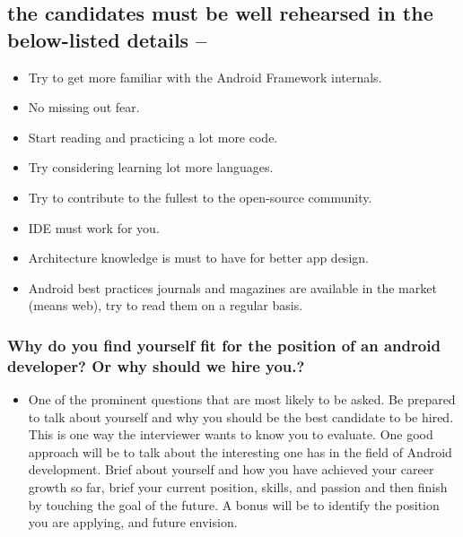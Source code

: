 \documentclass[9pt, b5paper]{article}
\begin{document}
\subsection{the candidates must be well rehearsed in the below-listed details –}
\label{sec-1-9}
\begin{itemize}
\item Try to get more familiar with the Android Framework internals.
\item No missing out fear.
\item Start reading and practicing a lot more code.
\item Try considering learning lot more languages.
\item Try to contribute to the fullest to the open-source community.
\item IDE must work for you.
\item Architecture knowledge is must to have for better app design.
\item Android best practices journals and magazines are available in the market (means web), try to read them on a regular basis.
\end{itemize}

\subsubsection{Why do you find yourself fit for the position of an android developer? Or why should we hire you.?}
\label{sec-1-9-1}
\begin{itemize}
\item One of the prominent questions that are most likely to be asked. Be prepared to talk about yourself and why you should be the best candidate to be hired. This is one way the interviewer wants to know you to evaluate. One good approach will be to talk about the interesting one has in the field of Android development. Brief about yourself and how you have achieved your career growth so far, brief your current position, skills, and passion and then finish by touching the goal of the future. A bonus will be to identify the position you are applying, and future envision.
\end{itemize}
\end{document}
